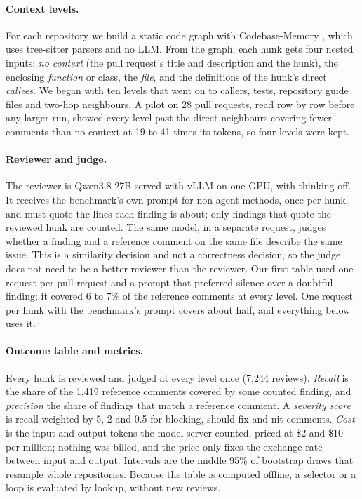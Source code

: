 \documentclass{article}
\begin{document}
\paragraph{Context levels.} For each repository we build a static code graph with Codebase-Memory \citep{vogel2026codebasememory}, which uses tree-sitter parsers and no LLM. From the graph, each hunk gets four nested inputs: \emph{no context} (the pull request's title and description and the hunk), the enclosing \emph{function} or class, the \emph{file}, and the definitions of the hunk's direct \emph{callees}. We began with ten levels that went on to callers, tests, repository guide files and two-hop neighbours. A pilot on 28 pull requests, read row by row before any larger run, showed every level past the direct neighbours covering fewer comments than no context at 19 to 41 times its tokens, so four levels were kept.

\paragraph{Reviewer and judge.} The reviewer is Qwen3.8-27B \citep{qwen38} served with vLLM \citep{kwon2023vllm} on one GPU, with thinking off. It receives the benchmark's own prompt for non-agent methods, once per hunk, and must quote the lines each finding is about; only findings that quote the reviewed hunk are counted. The same model, in a separate request, judges whether a finding and a reference comment on the same file describe the same issue. This is a similarity decision and not a correctness decision, so the judge does not need to be a better reviewer than the reviewer. Our first table used one request per pull request and a prompt that preferred silence over a doubtful finding; it covered 6 to 7\% of the reference comments at every level. One request per hunk with the benchmark's prompt covers about half, and everything below uses it.

\paragraph{Outcome table and metrics.} Every hunk is reviewed and judged at every level once (7,244 reviews). \emph{Recall} is the share of the 1,419 reference comments covered by some counted finding, and \emph{precision} the share of findings that match a reference comment. A \emph{severity score} is recall weighted by 5, 2 and 0.5 for blocking, should-fix and nit comments. \emph{Cost} is the input and output tokens the model server counted, priced at \$2 and \$10 per million; nothing was billed, and the price only fixes the exchange rate between input and output. Intervals are the middle 95\% of bootstrap draws that resample whole repositories. Because the table is computed offline, a selector or a loop is evaluated by lookup, without new reviews.
\end{document}

